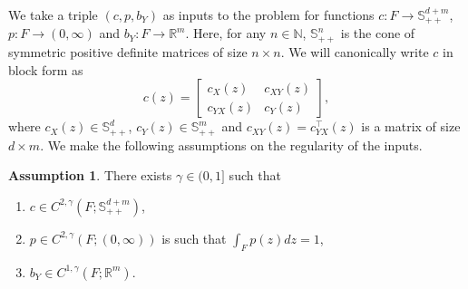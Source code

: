 \documentclass{article}
\theoremstyle{plain}
\theoremstyle{definition}
\newtheorem{assum}[lem]{Assumption}
\newcommand{\R}{\mathbb{R}}
\newcommand{\N}{\mathbb{N}}
\numberwithin{lem}{section}
\begin{document}
We take a triple $(c,p,b_Y)$ as inputs to the problem for functions $c:F \to \mathbb{S}^{d+m}_{++}$, $p:F\to (0,\infty)$ and $b_Y:F \to \R^m$. Here, for any $n \in \N$, $\mathbb{S}^{n}_{++}$ is the cone of symmetric positive definite matrices of size $n \times n$. We will canonically write $c$ in block form as \[c(z) = \begin{bmatrix}
    c_X(z) & c_{XY}(z) \\ c_{YX}(z) & c_Y(z)
\end{bmatrix},\] where $c_X(z) \in \mathbb{S}^{d}_{++}$, $c_Y(z) \in \mathbb{S}^m_{++}$ and $c_{XY}(z) = c_{YX}^\top (z)$ is a matrix of size $d \times m$. We make the following assumptions on the regularity of the inputs. 
\begin{assum}
\label{ass:inputs}
There exists $\gamma \in (0,1]$ such that 
\begin{enumerate}[noitemsep] 
\item $c \in C^{2,\gamma}(F;\mathbb{S}^{d+m}_{++})$,
\item $p \in C^{2,\gamma}(F;(0,\infty))$ is such that $\int_F p(z)dz = 1$,
\item $b_Y \in C^{1,\gamma}(F;\R^m)$.
\end{enumerate}
\end{assum} 
\end{document}
